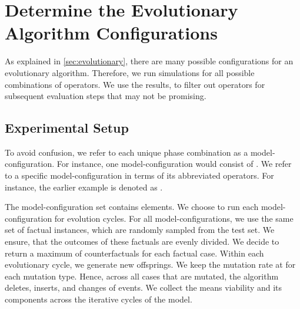 \documentclass[./../../paper.tex]{subfiles}
\begin{document}
\section{Determine the Evolutionary Algorithm Configurations}
As explained in \autoref{sec:evolutionary}, there are many possible configurations for an evolutionary algorithm. Therefore, we run simulations for all possible combinations of operators. We use the results, to filter out operators for subsequent evaluation steps that may not be promising.

\subsection{Experimental Setup}
\label{sec:exp1}
 To avoid confusion, we refer to each unique phase combination as a model-configuration. For instance, one model-configuration would consist of . We refer to a specific model-configuration in terms of its abbreviated operators. For instance, the earlier example is denoted as .

The model-configuration set contains  elements. We choose to run each model-configuration for  evolution cycles. For all model-configurations, we use the same set of  factual \glspl{instance}, which are randomly sampled from the test set. We ensure, that the outcomes of these factuals are evenly divided. We decide to return a maximum of  counterfactuals for each factual case. Within each evolutionary cycle, we generate  new offsprings. We keep the mutation rate at  for each mutation type. Hence, across all cases that are mutated, the algorithm deletes, inserts, and changes  of events. We collect the means viability and its components across the iterative cycles of the model.

\end{document}

